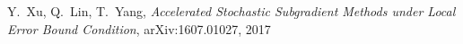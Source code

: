\documentclass[,conference,compsoc]{IEEEtran}
\begin{document}

%
%
%
\begin{thebibliography}{1}

Y.~Xu, Q.~Lin, T.~Yang, \emph{Accelerated Stochastic Subgradient Methods
under Local Error Bound Condition}, arXiv:1607.01027, 2017

\end{thebibliography}




\end{document}
